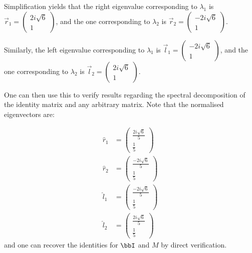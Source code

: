\documentclass[a4paper, 12pt,oneside,openany]{book}
\begin{document}
{	Simplification yields that the right eigenvalue corresponding to $\lambda_1$ is $\vec{r}_1=\begin{pmatrix} 2i\sqrt{6} \\ 1 \end{pmatrix}$, and the one corresponding to $\lambda_2$ is $\vec{r}_2=\begin{pmatrix} -2i\sqrt{6} \\ 1 \end{pmatrix}$. 
	
	Similarly, the left eigenvalue corresponding to $\lambda_1$ is $\vec{l}_1=\begin{pmatrix} -2i\sqrt{6} \\ 1 \end{pmatrix}$, and the one corresponding to $\lambda_2$ is $\vec{l}_2=\begin{pmatrix} 2i\sqrt{6} \\ 1 \end{pmatrix}$.
} 

One can then use this to verify results regarding the spectral decomposition of the identity matrix and any arbitrary matrix. Note that the normalised eigenvectors are: 
	
	\begin{align*} \hat{r}_1&=\begin{pmatrix} \frac{2i\sqrt{6}}{5} \\ \frac{1}{5} \end{pmatrix} \\ \hat{r}_2&=\begin{pmatrix} \frac{-2i\sqrt{6}}{5} \\ \frac{1}{5} \end{pmatrix} \\ \hat{l}_1&=\begin{pmatrix} \frac{-2i\sqrt{6}}{5} \\ \frac{1}{5} \end{pmatrix} \\ \hat{l}_2&=\begin{pmatrix} \frac{2i\sqrt{6}}{5} \\ \frac{1}{5} \end{pmatrix} \end{align*} and one can recover the identities for $\bbI$ and $M$ by direct verification.
	
\end{document}
